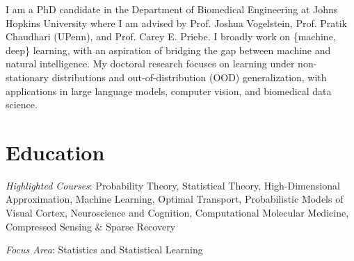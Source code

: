 \documentclass[10pt,a4paper,sans]{moderncv} %
\begin{document}
\makecvtitle %
I am a PhD candidate in the Department of Biomedical Engineering at Johns Hopkins University 
where I am advised by Prof. Joshua Vogelstein, Prof. Pratik Chaudhari (UPenn), and Prof. Carey E. Priebe. 
I broadly work on \{machine, deep\} learning, with an aspiration of bridging the gap between 
machine and natural intelligence. My doctoral research focuses on learning under non-stationary 
distributions and out-of-distribution (OOD) generalization, with
applications in large language models, computer vision, 
and biomedical data science.


\section{Education}
{\textit{Highlighted Courses}: Probability Theory, Statistical Theory, High-Dimensional Approximation, Machine Learning, Optimal Transport, Probabilistic Models of Visual Cortex, Neuroscience and Cognition, Computational Molecular Medicine, Compressed Sensing \& Sparse Recovery}

{\textit{Focus Area}: Statistics and Statistical Learning}


\let\thefootnote\relax{}

\end{document}
